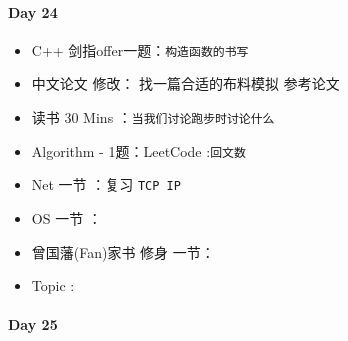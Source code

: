 \documentclass[UTF8,a4paper,8pt]{ctexart}
\begin{document}
 	 \paragraph{Day 24      \quad     }
	 	  \begin{itemize}[itemindent = 1em]
	 	  	\renewcommand\labelitemi{\makebox[0pt][l]{$\square$}\hspace{1em}} 
	 	  	\renewcommand\labelitemi{\makebox[0pt][l]{$\square$}\raisebox{.15ex}{\hspace{0.1em}$\checkmark$}}	 	
	 	  	\item   C++ 剑指offer一题：\verb|构造函数的书写|
	 	  	\item   中文论文 修改： 找一篇合适的布料模拟 参考论文
	 	  	
	 	  	\item   读书  30 Mins	：\verb|当我们讨论跑步时讨论什么|
	 	  	\item   Algorithm - 1题：LeetCode :\verb|回文数|	
	 	  	\item   Net 一节 ：复习 \verb|TCP IP|	
	 	  	\renewcommand\labelitemi{\makebox[0pt][l]{$\square$}\hspace{1em}} 
	 	  	
	 	  	\item   OS  一节 ：
	 	  	
	 	  	\renewcommand\labelitemi{\makebox[0pt][l]{$\square$}\raisebox{.15ex}{\hspace{0.1em}$\checkmark$}}
	 	  	\item   曾国藩(Fan)家书 修身 一节：
	 	  	\item   Topic : 
	 	  \end{itemize}
 	 \paragraph{Day 25      \quad     }
\end{document}

